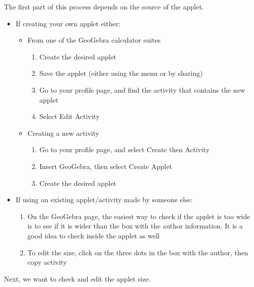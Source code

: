 \documentclass{ximera}
\begin{document}
        The first part of this process depends on the source of the applet.    
        \begin{itemize}
            \item If creating your own applet either:
            
            \begin{itemize}
                \item From one of the GeoGebra calculator suites
                \begin{enumerate}
                    \item Create the desired applet
                    \item Save the applet (either using the menu or by sharing)
                    \item Go to your profile page, and find the activity that contains the new applet
                    \item Select Edit Activity
                \end{enumerate}
                \item Creating a new activity
                \begin{enumerate}
                    \item Go to your profile page, and select Create then Activity
                    \item Insert GeoGebra, then select Create Applet
                    \item Create the desired applet
                \end{enumerate}
            \end{itemize}
            \item If using an existing applet/activity made by someone else:
            \begin{enumerate}
                \item On the GeoGebra page, the easiest way to check if the applet is too wide is to see if it is wider than the box with the author information. It is a good idea to check inside the applet as well
                \item To edit the size, click on the three dots in the box with the author, then copy activity
            \end{enumerate}
        \end{itemize}

        Next, we want to check and edit the applet size.
        
\end{document}
